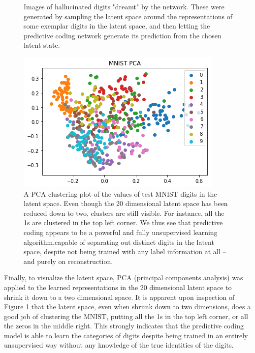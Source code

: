 \begin{figure}[htb]
\begin{subfigure}{.3\linewidth}
\end{subfigure}
\caption{Images of hallucinated digits "dreamt" by the network. These were generated by sampling the latent space around the representations of some exemplar digits in the latent space, and then letting the predictive coding network generate its prediction from the chosen latent state.}
\end{figure}

\begin{figure}[H]
\label{PCA_figure}
\centering
\includegraphics[scale=0.6]{chapter_3_figures/mnist_pca.png}
\caption{A PCA clustering plot of the values of test MNIST digits in the latent space. Even though the 20 dimensional latent space has been reduced down to two, clusters are still visible. For instance, all the 1s are clustered in the top left corner. We thus see that predictive coding appears to be a powerful and fully unsupervised learning algorithm,capable of separating out distinct digits in the latent space, despite not being trained with any label information at all -- and purely on reconstruction.}
\end{figure}

Finally, to visualize the latent space, PCA (principal components analysis) was applied to the learned representations in the 20 dimensional latent space to shrink it down to a two dimensional space. It is apparent upon inspection of Figure \ref{PCA_figure} that the latent space, even when shrunk down to two dimensions, does a good job of clustering the MNIST, putting all the 1s in the top left corner, or all the zeros in the middle right. This strongly indicates that the predictive coding model is able to learn the categories of digits despite being trained in an entirely unsupervised way without any knowledge of the true identities of the digits.

